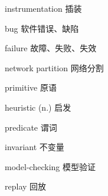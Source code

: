 \begin{denotation}

\item[instrumentation] 插装
\item[bug] 软件错误、缺陷
\item[failure] 故障、失败、失效
\item[network partition] 网络分割
\item[primitive] 原语
\item[heuristic (n.)] 启发
\item[predicate] 谓词
\item[invariant] 不变量
\item[model-checking] 模型验证
\item[replay] 回放

\end{denotation}
